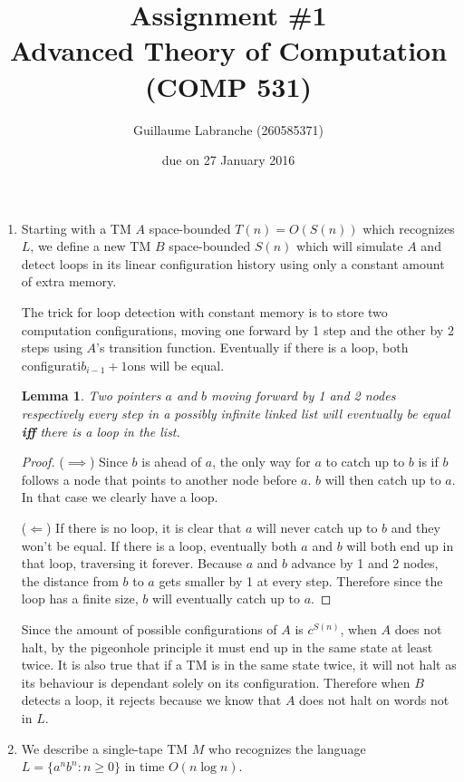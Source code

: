 \documentclass{article}
\author{Guillaume Labranche (260585371)}
\title{Assignment \#1\\Advanced Theory of Computation (COMP 531)}
\date{due on 27 January 2016}
\newtheorem{lemma}{Lemma}
\begin{document}
\maketitle

\begin{enumerate}

\item Starting with a TM $A$ space-bounded $T(n)=O(S(n))$ which recognizes $L$, we define a new TM $B$ space-bounded $S(n)$ which will simulate $A$ and detect loops in its linear configuration history using only a constant amount of extra memory.

The trick for loop detection with constant memory is to store two computation configurations, moving one forward by 1 step and the other by 2 steps using $A$'s transition function. Eventually if there is a loop, both configurati$b_{i-1}+1$ons will be equal.
\begin{lemma} Two pointers $a$ and $b$ moving forward by 1 and 2 nodes respectively every step in a possibly infinite linked list will eventually be equal \textbf{iff} there is a loop in the list.\end{lemma}
\begin{proof}($\implies$) Since $b$ is ahead of $a$, the only way for $a$ to catch up to $b$ is if $b$ follows a node that points to another node before $a$. $b$ will then catch up to $a$. In that case we clearly have a loop.

($\Longleftarrow$) If there is no loop, it is clear that $a$ will never catch up to $b$ and they won't be equal.
If there is a loop, eventually both $a$ and $b$ will both end up in that loop, traversing it forever. Because $a$ and $b$ advance by 1 and 2 nodes, the distance from $b$ to $a$ gets smaller by 1 at every step. Therefore since the loop has a finite size, $b$ will eventually catch up to $a$.
\end{proof}

Since the amount of possible configurations of $A$ is $c^{S(n)}$, when $A$ does not halt, by the pigeonhole principle it must end up in the same state at least twice. It is also true that if a TM is in the same state twice, it will not halt as its behaviour is dependant solely on its configuration. Therefore when $B$ detects a loop, it rejects because we know that $A$ does not halt on words not in $L$.


\item We describe a single-tape TM $M$ who recognizes the language $L = \{a^nb^n : n 	\geq 0 \}$ in time $O(n \log n)$.


\end{enumerate}
\end{document}
